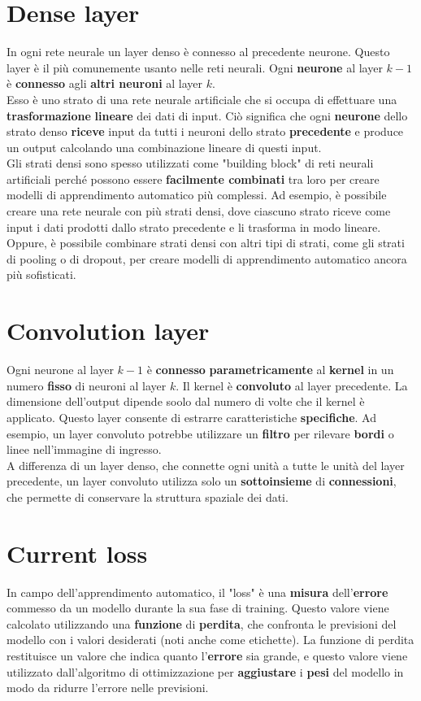 \documentclass{article}
\begin{document}
\section{Dense layer}
In ogni rete neurale un layer denso è connesso al precedente neurone. Questo layer è il più comunemente usanto nelle reti neurali. Ogni \textbf{neurone} al layer $k-1$ è \textbf{connesso} agli \textbf{altri neuroni} al layer $k$.
\\
Esso è uno strato di una rete neurale artificiale che si occupa di effettuare una \textbf{trasformazione} \textbf{lineare} dei dati di input. Ciò significa che ogni \textbf{neurone} dello strato denso \textbf{riceve} input da tutti i neuroni dello strato \textbf{precedente} e produce un output calcolando una combinazione lineare di questi input.
\\
Gli strati densi sono spesso utilizzati come "building block" di reti neurali artificiali perché possono essere \textbf{facilmente combinati} tra loro per creare modelli di apprendimento automatico più complessi. Ad esempio, è possibile creare una rete neurale con più strati densi, dove ciascuno strato riceve come input i dati prodotti dallo strato precedente e li trasforma in modo lineare. Oppure, è possibile combinare strati densi con altri tipi di strati, come gli strati di pooling o di dropout, per creare modelli di apprendimento automatico ancora più sofisticati.

\section{Convolution layer}
Ogni neurone al layer $k-1$ è \textbf{connesso} \textbf{parametricamente} al \textbf{kernel} in un numero \textbf{fisso} di neuroni al layer $k$. Il kernel è \textbf{convoluto} al layer precedente. La dimensione dell'output dipende soolo dal numero di volte che il kernel è applicato. Questo layer consente di estrarre caratteristiche \textbf{specifiche}. Ad esempio, un layer convoluto potrebbe utilizzare un \textbf{filtro} per rilevare \textbf{bordi} o linee nell'immagine di ingresso.\\
A differenza di un layer denso, che connette ogni unità a tutte le unità del layer precedente, un layer convoluto utilizza solo un \textbf{sottoinsieme} di \textbf{connessioni}, che permette di conservare la struttura spaziale dei dati.

\section{Current loss}
In campo dell'apprendimento automatico, il "loss" è una \textbf{misura} dell'\textbf{errore} commesso da un modello durante la sua fase di training. Questo valore viene calcolato utilizzando una \textbf{funzione} di \textbf{perdita}, che confronta le previsioni del modello con i valori desiderati (noti anche come etichette). La funzione di perdita restituisce un valore che indica quanto l'\textbf{errore} sia grande, e questo valore viene utilizzato dall'algoritmo di ottimizzazione per \textbf{aggiustare} i \textbf{pesi} del modello in modo da ridurre l'errore nelle previsioni.
\end{document}
